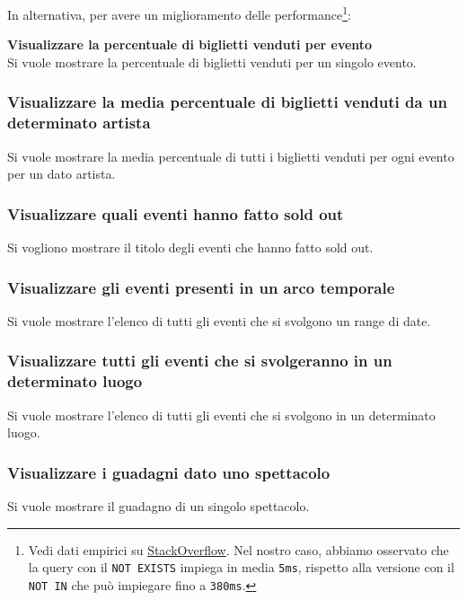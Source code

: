 \documentclass[a4paper,11pt]{article}
\begin{document}
In alternativa, per avere un miglioramento delle performance\footnote{
Vedi dati empirici su \href{https://stackoverflow.com/a/66785790}{StackOverflow}.
Nel nostro caso, abbiamo osservato che la query con il \texttt{NOT EXISTS}
impiega in media \texttt{5ms}, rispetto alla versione con il \texttt{NOT IN}
che può impiegare fino a \texttt{380ms}.}:


\textbf{Visualizzare la percentuale di biglietti venduti per evento}\\
\label{percentage-sold-tickets-by-event}
Si vuole mostrare la percentuale di biglietti venduti per un singolo evento.


\subsubsection{Visualizzare la media percentuale di biglietti venduti da un determinato artista}
Si vuole mostrare la media percentuale di tutti i biglietti venduti per ogni
evento per un dato artista.


\subsubsection{Visualizzare quali eventi hanno fatto sold out}
Si vogliono mostrare il titolo degli eventi che hanno fatto sold out.

 
\subsubsection{Visualizzare gli eventi presenti in un arco temporale}
Si vuole mostrare l'elenco di tutti gli eventi che si svolgono un range di date.


\subsubsection{Visualizzare tutti gli eventi che si svolgeranno in un determinato luogo}
Si vuole mostrare l'elenco di tutti gli eventi che si svolgono in un determinato luogo.


\subsubsection{Visualizzare i guadagni dato uno spettacolo}
Si vuole mostrare il guadagno di un singolo spettacolo.

\end{document}
